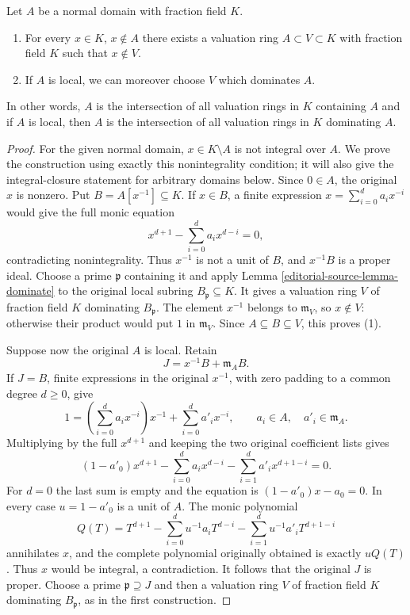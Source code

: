 \begin{lemma}
\label{editorial-source-lemma-find-valuation-rings}
Let $A$ be a normal domain with fraction field $K$.
\begin{enumerate}
\item For every $x \in K$, $x \not \in A$ there exists a valuation ring
$A \subset V \subset K$ with fraction field $K$ such that $x \not \in V$.
\item If $A$ is local, we can moreover choose $V$ which dominates $A$.
\end{enumerate}
In other words, $A$ is the intersection of all valuation rings in $K$
containing $A$ and if $A$ is local, then $A$ is the intersection of
all valuation rings in $K$ dominating $A$.
\end{lemma}

\begin{proof}
For the given normal domain,
$x\in K\setminus A$ is
not integral over $A$.
We prove the construction
using exactly this nonintegrality
condition; it will also give
the integral-closure statement
for arbitrary domains below.
Since $0\in A$, the original
$x$ is nonzero. Put
$B=A[x^{-1}]\subseteq K$.
If $x\in B$, a finite
expression
$x=\sum_{i=0}^d a_i x^{-i}$
would give the full monic
equation
$$
x^{d+1}-\sum_{i=0}^d a_i x^{d-i}=0,
$$
contradicting nonintegrality.
Thus $x^{-1}$ is not a
unit of $B$, and
$x^{-1}B$ is a proper
ideal. Choose a prime
$\mathfrak p$ containing it
and apply Lemma
\ref{editorial-source-lemma-dominate} to the
original local subring
$B_{\mathfrak p}\subseteq K$.
It gives a valuation ring
$V$ of fraction field $K$
dominating $B_{\mathfrak p}$.
The element $x^{-1}$ belongs
to $\mathfrak m_V$, so
$x\notin V$: otherwise
their product would put
$1$ in $\mathfrak m_V$.
Since $A\subseteq B\subseteq V$,
this proves (1).

Suppose now the original
$A$ is local. Retain
$$
J=x^{-1}B+\mathfrak m_A B.
$$
If $J=B$, finite expressions
in the original $x^{-1}$,
with zero padding to a
common degree $d\geq0$,
give
$$
1=\left(\sum_{i=0}^d a_i x^{-i}\right)x^{-1}
+\sum_{i=0}^d a'_i x^{-i},
\qquad a_i\in A,\quad a'_i\in\mathfrak m_A.
$$
Multiplying by the full
$x^{d+1}$ and keeping the
two original coefficient lists
gives
$$
(1-a'_0)x^{d+1}
-\sum_{i=0}^d a_i x^{d-i}
-\sum_{i=1}^d a'_i x^{d+1-i}=0.
$$
For $d=0$ the last sum
is empty and the equation
is $(1-a'_0)x-a_0=0$.
In every case $u=1-a'_0$
is a unit of $A$.
The monic polynomial
$$
Q(T)=T^{d+1}
-\sum_{i=0}^d u^{-1}a_i T^{d-i}
-\sum_{i=1}^d u^{-1}a'_i T^{d+1-i}
$$
annihilates $x$, and the
complete polynomial originally
obtained is exactly $uQ(T)$.
Thus $x$ would be integral,
a contradiction. It follows
that the original $J$ is
proper. Choose a prime
$\mathfrak p\supseteq J$ and
then a valuation ring $V$
of fraction field $K$
dominating $B_{\mathfrak p}$,
as in the first construction.


\end{proof}
